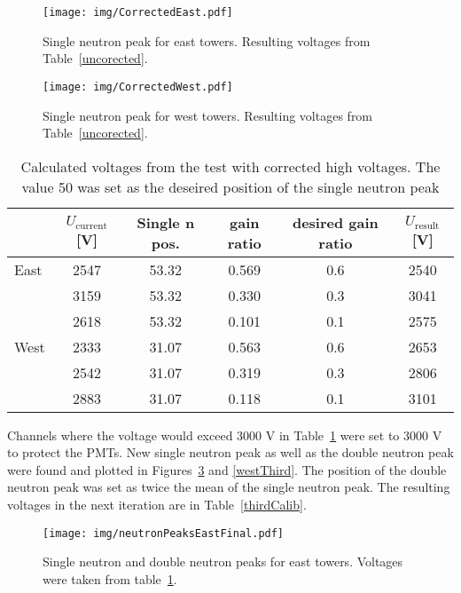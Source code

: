 \begin{figure}[!htb]
\begin{center}
\texttt{[image: img/CorrectedEast.pdf]}
\end{center}
\caption{Single neutron peak for east towers. Resulting voltages from Table~\ref{uncorected}.}
\label{eastPlot}
\end{figure}

\begin{figure}[!htb]
\begin{center}
\texttt{[image: img/CorrectedWest.pdf]}
\end{center}
\caption{Single neutron peak for west towers. Resulting voltages from Table~\ref{uncorected}.}
\label{westPlot}
\end{figure}

\begin{table}[!htb] 
\caption{Calculated voltages from the test with corrected high voltages.
The value 50 was set as the deseired position of the single neutron peak}
\label{corected}
\begin{center}
\begin{tabular}{lccccc}
\toprule
&$U_\text{current}$[V]&Single n pos.&gain ratio&desired gain ratio&$U_\text{result}$[V]\\
\midrule
 East&2547&53.32&0.569&0.6&2540\\
     &3159&53.32&0.330&0.3&3041\\
     &2618&53.32&0.101&0.1&2575\\
\midrule
West&2333&31.07&0.563&0.6&2653\\
    &2542&31.07&0.319&0.3&2806\\
    &2883&31.07&0.118&0.1&3101\\
\bottomrule
\end{tabular}
\end{center}
\end{table}

Channels where the voltage would exceed 3000 V in Table~\ref{corected} were set to 3000 V to
protect the PMTs. New single neutron peak as well as the double neutron peak were found and
plotted in Figures~\ref{eastThird}
and \ref{westThird}. The position of the double neutron peak was set as twice the mean
of the single neutron peak.
The resulting voltages in the next iteration are in Table~\ref{thirdCalib}.

\begin{figure}[htb]
\begin{center}
\texttt{[image: img/neutronPeaksEastFinal.pdf]}
\end{center}
\caption{Single neutron and double neutron peaks for east towers.
Voltages were taken from table~\ref{corected}.}
\label{eastThird}
\end{figure}

